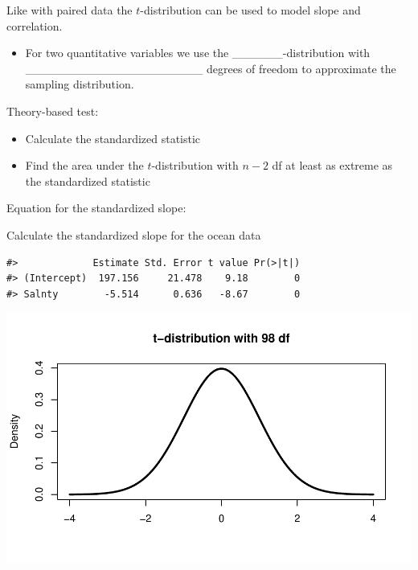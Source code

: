 \documentclass[
]{report}
\newenvironment{Shaded}{\begin{snugshade}}{\end{snugshade}}
\newcommand{\AttributeTok}[1]{\textcolor[rgb]{0.13,0.29,0.53}{#1}}
\newcommand{\CommentTok}[1]{\textcolor[rgb]{0.56,0.35,0.01}{\textit{#1}}}
\newcommand{\DecValTok}[1]{\textcolor[rgb]{0.00,0.00,0.81}{#1}}
\newcommand{\FunctionTok}[1]{\textcolor[rgb]{0.13,0.29,0.53}{\textbf{#1}}}
\newcommand{\NormalTok}[1]{#1}
\newcommand{\OtherTok}[1]{\textcolor[rgb]{0.56,0.35,0.01}{#1}}
\newcommand{\SpecialCharTok}[1]{\textcolor[rgb]{0.81,0.36,0.00}{\textbf{#1}}}
\providecommand{\tightlist}{%
  \setlength{\itemsep}{0pt}\setlength{\parskip}{0pt}}
\begin{document}
Like with paired data the \(t\)-distribution can be used to model slope and correlation.


\begin{itemize}
\tightlist
\item
  For two quantitative variables we use the \_\_\_\_\_\_-distribution
  with \_\_\_\_\_\_\_\_\_\_\_\_\_\_\_\_\_\_\_\_\_ degrees of freedom to approximate the sampling distribution.
\end{itemize}


Theory-based test:

\begin{itemize}
\item
  Calculate the standardized statistic
\item
  Find the area under the \(t\)-distribution with \(n - 2\) df at least as extreme as the standardized statistic
\end{itemize}

Equation for the standardized slope:

\vspace{0.8in}

Calculate the standardized slope for the ocean data

\begin{Shaded}
\end{Shaded}

\begin{verbatim}
#>             Estimate Std. Error t value Pr(>|t|)
#> (Intercept)  197.156     21.478    9.18        0
#> Salnty        -5.514      0.636   -8.67        0
\end{verbatim}

\vspace{1in}

\begin{center}\includegraphics[width=0.7\linewidth]{13-VN13-regression_files/figure-latex/pvalueoce-1} \end{center}
\end{document}
